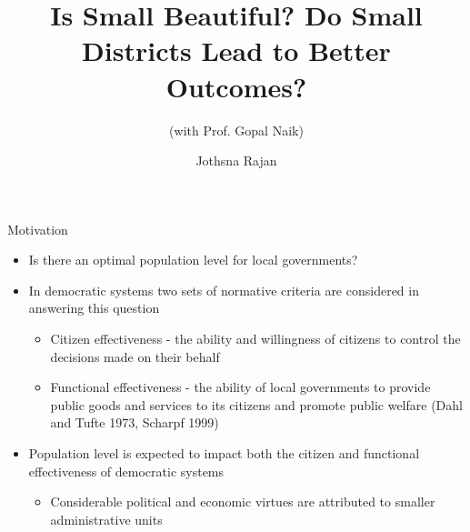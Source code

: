 \documentclass{beamer}
\title[Comprehensive Examination - 2016]{Is Small Beautiful? Do Small Districts Lead to Better Outcomes?}
\subtitle
{(with Prof. Gopal Naik)}
\author{Jothsna Rajan}
\institute[]{Indian Institute of Management, Bangalore}
\date{}
\begin{document}
	
	\begin{frame}
		\titlepage
	\end{frame}
	
	\begin{frame}{Motivation}
		\begin{itemize}
			\item Is there an optimal population level for local governments?
			\item In democratic systems two sets of normative criteria are considered in answering this question
			\begin{itemize}
				\item Citizen effectiveness - the ability and willingness of citizens to control the decisions made on their behalf
				\item Functional effectiveness - the ability of local governments to provide public goods and services to its citizens and promote public welfare (Dahl and Tufte 1973, Scharpf 1999)
			\end{itemize}
			\item Population level is expected to impact both the citizen and functional effectiveness of democratic systems
			\begin{itemize}
				\item Considerable political and economic virtues are attributed to smaller administrative units
			\end{itemize}
		\end{itemize}
	\end{frame}
	
\end{document}

